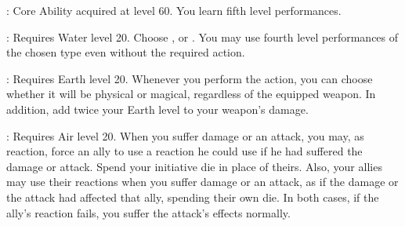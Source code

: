 \begin{ffminipage}
  : Core Ability acquired at level 60. You learn fifth level performances.\pc
  \begin{jobchoice}
    : Requires Water level 20. Choose ,  or . You may use fourth level performances of the chosen type even without the required action.

    : Requires Earth level 20. Whenever you perform the  action, you can choose whether it will be physical or magical, regardless of the equipped weapon. In addition, add twice your Earth level to your weapon's damage.

    : Requires Air level 20. When you suffer damage or an attack, you may, as reaction, force an ally to use a reaction he could use if he had suffered the damage or attack. Spend your initiative die in place of theirs. Also, your allies may use their reactions when you suffer damage or an attack, as if the damage or the attack had affected that ally, spending their own die. In both cases, if the ally's reaction fails, you suffer the attack's effects normally.
  \end{jobchoice}
\end{ffminipage}




